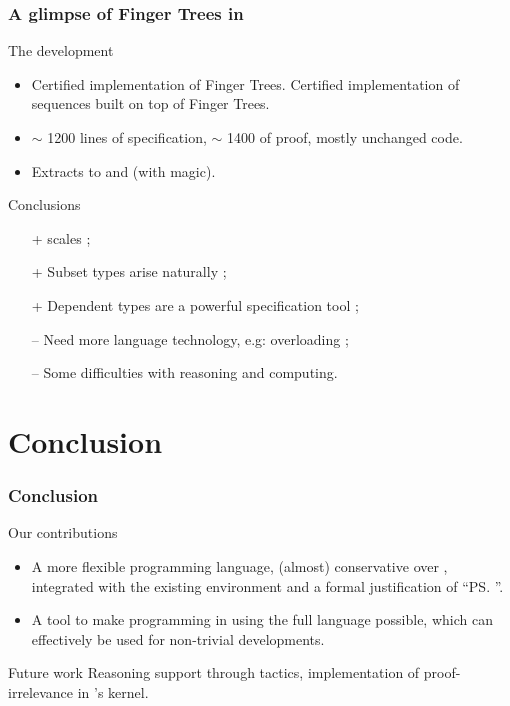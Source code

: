 \begin{frame}
  \frametitle{A glimpse of Finger Trees in \Coq}
  
  \begin{block}{The development}
    \begin{itemize}
    \item Certified implementation of Finger Trees. 
      Certified implementation of sequences built on top of Finger Trees.
    \item $\sim$ 1200 lines of specification, $\sim$ 1400 of proof, mostly unchanged
      code.
    \item Extracts to \Haskell and \Ocaml (with magic).
    \end{itemize}
  \end{block}
  \pause
  \begin{block}{Conclusions}
    \begin{itemize}
    \item[+] \Program scales ;
    \item[+] Subset types arise naturally ;
    \item[+] Dependent types are a powerful specification tool ;      
    \item[--] Need more language technology, e.g: overloading ;
    \item[--] Some difficulties with reasoning and computing.
    \end{itemize}   
  \end{block}
  
\end{frame}

\section{Conclusion}
\begin{frame}
  \frametitle{Conclusion}
  
  \begin{block}{Our contributions}
    \begin{itemize}
    \item A more \alert{flexible} programming language, (almost) \alert{conservative} over
      \CIC, \alert{integrated} with the existing environment and a
      formal \alert{justification} of ``\ps{}''.
    \item A tool to make \alert{programming} in \Coq using the \alert{full} language
      possible, which can \alert{effectively} be used for non-trivial
      developments.
    \end{itemize}
  \end{block}
  
  \begin{block}{Future work}
    Reasoning support through tactics, implementation of
    proof-irrelevance in \Coq's kernel.
  \end{block}
  
\end{frame}

